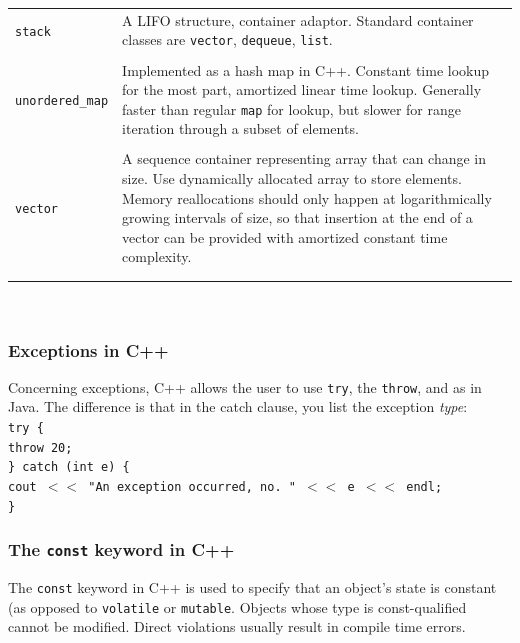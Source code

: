 \begin{tabular}{p{}p{}}
	\texttt{stack} & A LIFO structure, container adaptor. Standard container classes are \texttt{vector}, \texttt{dequeue}, \texttt{list}. \\
	\hfill \\
	\texttt{unordered\_map} & Implemented as a hash map in C++. Constant time lookup for the most part, amortized linear time lookup. Generally faster than regular \texttt{map} for lookup, but slower for range iteration through a subset of elements. \\
	\hfill \\
	\texttt{vector} & A sequence container representing array that can change in size. Use dynamically allocated array to store elements. Memory reallocations should only happen at logarithmically growing intervals of size, so that insertion at the end of a vector can be provided with amortized constant time complexity. \\
	\hfill \\
	\label{tab:cpp_structures}
\end{tabular} \\

\subsubsection{Exceptions in C++}

Concerning exceptions, C++ allows the user to use \texttt{try}, the \texttt{throw}, and  as in Java. The difference is that in the catch clause, you list the exception \textit{type}: \\

\indent \texttt{try \{} \\
\indent \indent \texttt{throw 20;} \\
\indent \texttt{\} catch (int e) \{} \\
\indent \indent \texttt{cout $<<$ "An exception occurred, no. " $<<$ e $<<$ endl;} \\
\indent \texttt{\}} \\

\subsubsection{The \texttt{const} keyword in C++}

The \texttt{const} keyword in C++ is used to specify that an object's state is constant (as opposed to \texttt{volatile} or \texttt{mutable}. Objects whose type is const-qualified cannot be modified. Direct violations usually result in compile time errors.

